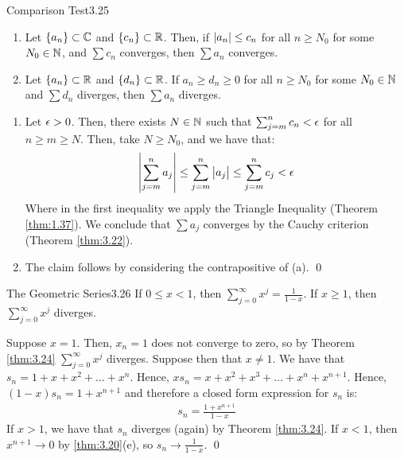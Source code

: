 \begin{theorem}{Comparison Test}{3.25}
    \begin{enumerate}
        \item Let $\set{a_n} \subset \mathbb{C}$ and $\set{c_n} \subset \mathbb{R}$. Then, if $\abs{a_n} \leq c_n$ for all $n \geq N_0$ for some $N_0 \in \mathbb{N}$, and $\sum c_n$ converges, then $\sum a_n$ converges. 
        \item Let $\set{a_n} \subset \mathbb{R}$ and $\set{d_n} \subset \mathbb{R}$. If $a_n \geq d_n \geq 0$ for all $n \geq N_0$ for some $N_0 \in \mathbb{N}$ and $\sum d_n$ diverges, then $\sum a_n$ diverges.
    \end{enumerate}
\end{theorem}
\begin{nproof}
    \begin{enumerate}
        \item Let $\epsilon > 0$. Then, there exists $N \in \mathbb{N}$ such that $\sum_{j = m}^n c_n < \epsilon$ for all $n \geq m \geq N$. Then, take $N \geq N_0$, and we have that:
        \begin{align*}
            \abs{\sum_{j=m}^n a_j} \leq \sum_{j=m}^n \abs{a_j} \leq \sum_{j=m}^n c_j < \epsilon
        \end{align*}
        Where in the first inequality we apply the Triangle Inequality (Theorem \ref{thm:1.37}). We conclude that $\sum a_j$ converges by the Cauchy criterion (Theorem \ref{thm:3.22}).
        \item The claim follows by considering the contrapositive of (a). \qed
    \end{enumerate}
\end{nproof}

\begin{theorem}{The Geometric Series}{3.26}
    If $0 \leq x < 1$, then $\sum_{j=0}^\infty x^j = \frac{1}{1-x}$. If $x \geq 1$, then $\sum_{j=0}^\infty x^j$ diverges.
\end{theorem}
\begin{nproof}
    Suppose $x = 1$. Then, $x_n = 1$ does not converge to zero, so by Theorem \ref{thm:3.24} $\sum_{j=0}^\infty x^j$ diverges. Suppose then that $x \neq 1$. We have that $s_n = 1 + x + x^2 + \ldots + x^n$. Hence, $xs_n = x + x^2 + x^3 + \ldots + x^n + x^{n+1}$. Hence, $(1-x)s_n = 1 + x^{n+1}$ and therefore a closed form expression for $s_n$ is:
    \begin{align*}
        s_n = \frac{1 + x^{n+1}}{1 - x}
    \end{align*}
    If $x > 1$, we have that $s_n$ diverges (again) by Theorem \ref{thm:3.24}. If $x < 1$, then $x^{n+1} \rightarrow 0$ by \ref{thm:3.20}(e), so $s_n \rightarrow \frac{1}{1-x}$. \qed
\end{nproof}

